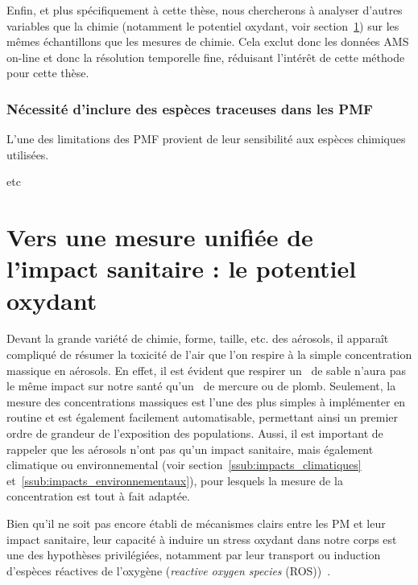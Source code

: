 Enfin, et plus spécifiquement à cette thèse, nous chercherons à analyser d'autres
variables que la chimie (notamment le potentiel oxydant, voir
section~\ref{sec:le_potentiel_oxydant_des_aerosols}) sur les mêmes échantillons que les
mesures de chimie. Cela exclut donc les données AMS on-line et donc la résolution
temporelle fine, réduisant l'intérêt de cette méthode pour cette thèse.

\subsubsection{Nécessité d'inclure des espèces traceuses dans les PMF}%
\label{ssub:nécessité_d_inclure_des_espèces_traceuses}

L'une des limitations des PMF provient de leur sensibilité aux espèces chimiques
utilisées.

\autocite{srivastavaSpeciation2018a}etc



\section{Vers une mesure unifiée de l'impact sanitaire : le potentiel oxydant}%
\label{sec:le_potentiel_oxydant_des_aerosols}

Devant la grande variété de chimie, forme, taille, etc. des aérosols, il apparaît
compliqué de résumer la toxicité de l'air que l'on respire à la simple concentration
massique en aérosols. En effet, il est évident que respirer un~\si{\ugm} de sable n'aura
pas le même impact sur notre santé qu'un~\si{\ugm} de mercure ou de plomb.  Seulement, la
mesure des concentrations massiques est l'une des plus simples à implémenter en routine et est également
facilement automatisable, permettant ainsi un premier ordre de grandeur de l'exposition
des populations. Aussi, il est important de rappeler que les aérosols n'ont pas qu'un
impact sanitaire, mais également climatique ou environnemental (voir
section~\ref{ssub:impacts_climatiques} et~\ref{ssub:impacts_environnementaux}),
pour lesquels la mesure de la concentration est tout à fait adaptée.

Bien qu'il ne soit pas encore établi de mécanismes clairs entre les PM et leur impact
sanitaire, leur capacité à induire un stress oxydant dans notre corps est une des
hypothèses privilégiées, notamment par leur transport ou induction d'espèces réactives de
l'oxygène (\textit{reactive oxygen species}
(ROS))~\autocite{squadritoQuinoid2001,liParticulate2003a,liUltrafine2003,gonzalez-flechaOxidant2004}.

